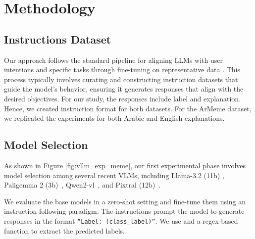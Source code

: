 \section{Methodology}
\label{sec:experiments}


\subsection{Instructions Dataset}
Our approach follows the standard pipeline for aligning LLMs with user intentions and specific tasks through fine-tuning on representative data \cite{zhang2023instruction,kmainasi2024llamalens}. 
This process typically involves curating and constructing instruction datasets that guide the model's behavior, ensuring it generates responses that align with the desired objectives. For our study, the responses include label and explanation. Hence, we created instruction format for both datasets.
%
For the ArMeme dataset, we replicated the experiments for both Arabic and English explanations.

\subsection{Model Selection}
As shown in Figure \ref{fig:vllm_exp_meme}, our first experimental phase involves model selection among several recent VLMs, including Llama-3.2 (11b) \cite{dubey2024llama}, Paligemma 2 (3b)~\cite{steiner2024paligemma}, Qwen2-vl~\cite{wang2024qwen2}, and Pixtral (12b)~\cite{agrawal2024pixtral}.

We evaluate the base models in a zero-shot setting and fine-tune them using an instruction-following paradigm. The instructions prompt the model to generate responses in the format \texttt{``Label: (class\_label)''}. We use and a regex-based function to extract the predicted labels.




